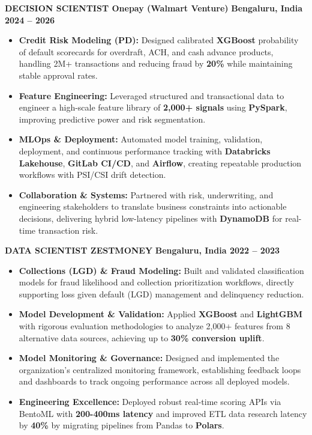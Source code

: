 \documentclass[10pt, letterpaper]{article}
\begin{document}
\noindent
\textbf{DECISION SCIENTIST \textbar{} Onepay (Walmart Venture)} \hfill \textbf{Bengaluru, India \textbar{} 2024 -- 2026}
\begin{itemize}[leftmargin=0.25in, itemsep=1pt]
    \item \textbf{Credit Risk Modeling (PD):} Designed calibrated \textbf{XGBoost} probability of default scorecards for overdraft, ACH, and cash advance products, handling 2M+ transactions and reducing fraud by \textbf{20\%} while maintaining stable approval rates.
    \item \textbf{Feature Engineering:} Leveraged structured and transactional data to engineer a high-scale feature library of \textbf{2,000+ signals} using \textbf{PySpark}, improving predictive power and risk segmentation.
    \item \textbf{MLOps \& Deployment:} Automated model training, validation, deployment, and continuous performance tracking with \textbf{Databricks Lakehouse}, \textbf{GitLab CI/CD}, and \textbf{Airflow}, creating repeatable production workflows with PSI/CSI drift detection.
    \item \textbf{Collaboration \& Systems:} Partnered with risk, underwriting, and engineering stakeholders to translate business constraints into actionable decisions, delivering hybrid low-latency pipelines with \textbf{DynamoDB} for real-time transaction risk.
\end{itemize}

\vspace{1ex}

\noindent
\textbf{DATA SCIENTIST \textbar{} ZESTMONEY} \hfill \textbf{Bengaluru, India \textbar{} 2022 -- 2023}
\begin{itemize}[leftmargin=0.25in, itemsep=1pt]
    \item \textbf{Collections (LGD) \& Fraud Modeling:} Built and validated classification models for fraud likelihood and collection prioritization workflows, directly supporting loss given default (LGD) management and delinquency reduction.
    \item \textbf{Model Development \& Validation:} Applied \textbf{XGBoost} and \textbf{LightGBM} with rigorous evaluation methodologies to analyze 2,000+ features from 8 alternative data sources, achieving up to \textbf{30\% conversion uplift}.
    \item \textbf{Model Monitoring \& Governance:} Designed and implemented the organization's centralized monitoring framework, establishing feedback loops and dashboards to track ongoing performance across all deployed models.
    \item \textbf{Engineering Excellence:} Deployed robust real-time scoring APIs via BentoML with \textbf{200-400ms latency} and improved ETL data research latency by \textbf{40\%} by migrating pipelines from Pandas to \textbf{Polars}.
\end{itemize}
\end{document}
